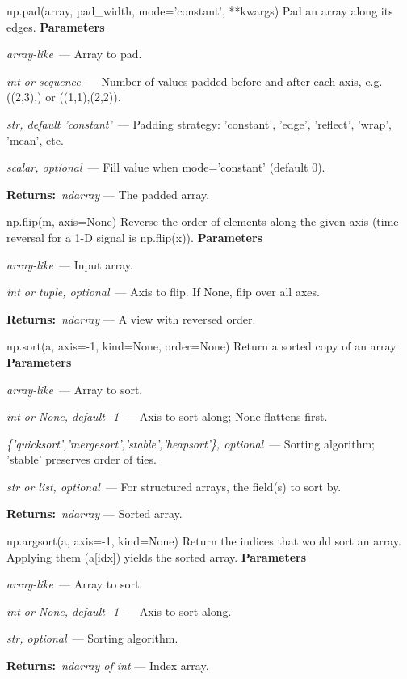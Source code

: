 \documentclass[10pt]{article}
\newenvironment{params}
  {\smallskip\textbf{\small\color{accent}Parameters}\par\nopagebreak
   \begin{description}[leftmargin=1.3em,itemsep=1.5pt,parsep=0pt,topsep=1pt,
      labelindent=0pt,style=sameline,font=\normalfont]}
  {\end{description}}
\newcommand{\pitem}[3]{\item[{\ttfamily\color{accent}#1}]{\itshape #2}\ --- #3}
\newcommand{\preturn}[2]{\smallskip\textbf{\small\color{accent}Returns:}\ {\itshape #1} --- #2\par}
\begin{document}
\begin{func}{np.pad(array, pad\_width, mode='constant', **kwargs)}
Pad an array along its edges.
\begin{params}
\pitem{array}{array-like}{Array to pad.}
\pitem{pad\_width}{int or sequence}{Number of values padded before and after each axis, e.g. ((2,3),) or ((1,1),(2,2)).}
\pitem{mode}{str, default 'constant'}{Padding strategy: 'constant', 'edge', 'reflect', 'wrap', 'mean', etc.}
\pitem{constant\_values}{scalar, optional}{Fill value when mode='constant' (default 0).}
\end{params}
\preturn{ndarray}{The padded array.}
\end{func}
\medskip

\begin{func}{np.flip(m, axis=None)}
Reverse the order of elements along the given axis (time reversal for a 1-D signal is np.flip(x)).
\begin{params}
\pitem{m}{array-like}{Input array.}
\pitem{axis}{int or tuple, optional}{Axis to flip. If None, flip over all axes.}
\end{params}
\preturn{ndarray}{A view with reversed order.}
\end{func}
\medskip

\begin{func}{np.sort(a, axis=-1, kind=None, order=None)}
Return a sorted copy of an array.
\begin{params}
\pitem{a}{array-like}{Array to sort.}
\pitem{axis}{int or None, default -1}{Axis to sort along; None flattens first.}
\pitem{kind}{\{'quicksort','mergesort','stable','heapsort'\}, optional}{Sorting algorithm; 'stable' preserves order of ties.}
\pitem{order}{str or list, optional}{For structured arrays, the field(s) to sort by.}
\end{params}
\preturn{ndarray}{Sorted array.}
\end{func}
\medskip

\begin{func}{np.argsort(a, axis=-1, kind=None)}
Return the indices that would sort an array. Applying them (a[idx]) yields the sorted array.
\begin{params}
\pitem{a}{array-like}{Array to sort.}
\pitem{axis}{int or None, default -1}{Axis to sort along.}
\pitem{kind}{str, optional}{Sorting algorithm.}
\end{params}
\preturn{ndarray of int}{Index array.}
\end{func}
\medskip
\end{document}
